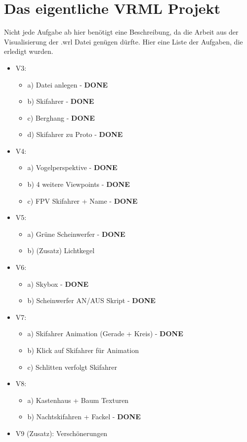 \documentclass{article}
\begin{document}
\newpage

\section*{Das eigentliche VRML Projekt}
Nicht jede Aufgabe ab hier benötigt eine Beschreibung, da die Arbeit aus der Visualisierung der .wrl
Datei genügen dürfte. Hier eine Liste der Aufgaben, die erledigt wurden.

\begin{itemize}
    \item V3:
    \begin{itemize}
        \item a) Datei anlegen - \textbf{DONE}
        \item b) Skifahrer - \textbf{DONE}
        \item c) Berghang - \textbf{DONE}
        \item d) Skifahrer zu Proto - \textbf{DONE}
    \end{itemize}
    \item V4:
    \begin{itemize}
        \item a) Vogelperspektive - \textbf{DONE}
        \item b) 4 weitere Viewpoints - \textbf{DONE}
        \item c) FPV Skifahrer + Name - \textbf{DONE}
    \end{itemize}
    \item V5:
    \begin{itemize}
        \item a) Grüne Scheinwerfer - \textbf{DONE}
        \item b) (Zusatz) Lichtkegel
    \end{itemize}
    \item V6:
    \begin{itemize}
        \item a) Skybox - \textbf{DONE}
        \item b) Scheinwerfer AN/AUS Skript - \textbf{DONE}
    \end{itemize}
    \item V7:
    \begin{itemize}
        \item a) Skifahrer Animation (Gerade + Kreis) - \textbf{DONE}
        \item b) Klick auf Skifahrer für Animation
        \item c) Schlitten verfolgt Skifahrer
    \end{itemize}
    \item V8:
    \begin{itemize}
        \item a) Kastenhaus + Baum Texturen
        \item b) Nachtskifahren + Fackel - \textbf{DONE}
    \end{itemize}
    \item V9 (Zusatz): Verschönerungen
\end{itemize}
\end{document}
